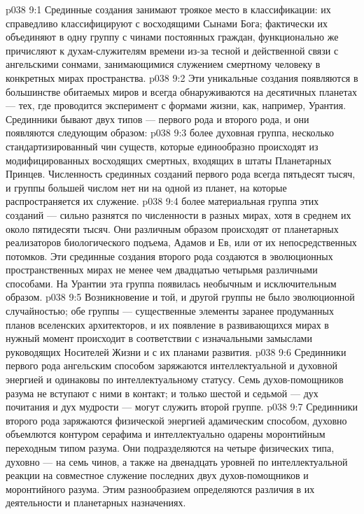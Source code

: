 \vs p038 9:1 Срединные создания занимают троякое место в классификации: их справедливо классифицируют с восходящими Сынами Бога; фактически их объединяют в одну группу с чинами постоянных граждан, функционально же причисляют к духам\hyp{}служителям времени из\hyp{}за тесной и действенной связи с ангельскими сонмами, занимающимися служением смертному человеку в конкретных мирах пространства.
\vs p038 9:2 Эти уникальные создания появляются в большинстве обитаемых миров и всегда обнаруживаются на десятичных планетах --- тех, где проводится эксперимент с формами жизни, как, например, Урантия. Срединники бывают двух типов --- первого рода и второго рода, и они появляются следующим образом:
\vs p038 9:3 \bibnobreakspace {} более духовная группа, несколько стандартизированный чин существ, которые единообразно происходят из модифицированных восходящих смертных, входящих в штаты Планетарных Принцев. Численность срединных созданий первого рода всегда пятьдесят тысяч, и группы большей числом нет ни на одной из планет, на которые распространяется их служение.
\vs p038 9:4 \bibnobreakspace {} более материальная группа этих созданий --- сильно разнятся по численности в разных мирах, хотя в среднем их около пятидесяти тысяч. Они различным образом происходят от планетарных реализаторов биологического подъема, Адамов и Ев, или от их непосредственных потомков. Эти срединные создания второго рода создаются в эволюционных пространственных мирах не менее чем двадцатью четырьмя различными способами. На Урантии эта группа появилась необычным и исключительным образом.
\vs p038 9:5 \pc Возникновение и той, и другой группы не было эволюционной случайностью; обе группы --- существенные элементы заранее продуманных планов вселенских архитекторов, и их появление в развивающихся мирах в нужный момент происходит в соответствии с изначальными замыслами руководящих Носителей Жизни и с их планами развития.
\vs p038 9:6 Срединники первого рода ангельским способом заряжаются интеллектуальной и духовной энергией и одинаковы по интеллектуальному статусу. Семь духов\hyp{}помощников разума не вступают с ними в контакт; и только шестой и седьмой --- дух почитания и дух мудрости --- могут служить второй группе.
\vs p038 9:7 Срединники второго рода заряжаются физической энергией адамическим способом, духовно объемлются контуром серафима и интеллектуально одарены моронтийным переходным типом разума. Они подразделяются на четыре физических типа, духовно --- на семь чинов, а также на двенадцать уровней по интеллектуальной реакции на совместное служение последних двух духов\hyp{}помощников и моронтийного разума. Этим разнообразием определяются различия в их деятельности и планетарных назначениях.
